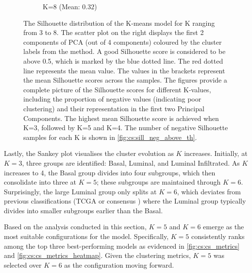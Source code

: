 \begin{figure}[H]
\begin{subfigure}[!t]{0.49\textwidth}
        \caption{K=8 (Mean: $0.32$)}
    \end{subfigure}
    \centering
    \caption{The Silhouette distribution of the K-means model for K ranging from 3 to 8. The scatter plot on the right displays the first 2 components of PCA (out of 4 components) coloured by the cluster labels from the method. A good Silhouette score is considered to be above 0.5, which is marked by the blue dotted line. The red dotted line represents the mean value. The values in the brackets represent the mean Silhouette scores across the samples. The figures provide a complete picture of the Silhouette scores for different K-values, including the proportion of negative values (indicating poor clustering) and their representation in the first two Principal Components. The highest mean Silhouette score is achieved when K=3, followed by K=5 and K=4. The number of negative Silhouette samples for each K is shown in \cref{fig:cs:sill_neg_above_th}.}
    \label{fig:cs:sill_distrib}
\end{figure}

Lastly, the Sankey plot visualises the cluster evolution as $K$ increases. Initially, at $K=3$, three groups are identified: Basal, Luminal, and Luminal Infiltrated. As $K$ increases to 4, the Basal group divides into four subgroups, which then consolidate into three at $K=5$; these subgroups are maintained through $K=6$. Surprisingly, the large Luminal group only splits at $K=6$, which deviates from previous classifications (TCGA \citet{Robertson2017-mg} or consensus \citet{Kamoun2020-tj}) where the Luminal group typically divides into smaller subgroups earlier than the Basal.

Based on the analysis conducted in this section, $K=5$ and $K=6$ emerge as the most suitable configurations for the model. Specifically, $K=5$ consistently ranks among the top three best-performing models as evidenced in \cref{fig:cs:cs_metrics} and \cref{fig:cs:cs_metrics_heatmap}. Given the clustering metrics, $K=5$ was selected over $K=6$ as the configuration moving forward.



